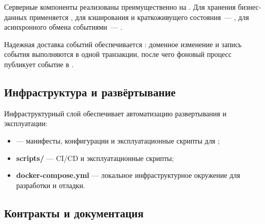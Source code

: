 \documentclass[12pt,a4paper]{extarticle}
\begin{document}
\begin{hseExample}
Серверные компоненты реализованы преимущественно на . Для хранения бизнес-данных применяется , для кэширования и краткоживущего состояния~--- , для асинхронного обмена событиями~--- .

Надежная доставка событий обеспечивается : доменное изменение и запись события выполняются в одной транзакции, после чего фоновый процесс публикует событие в .
\end{hseExample}

\subsection{Инфраструктура и развёртывание}

\begin{hseExample}
Инфраструктурный слой обеспечивает автоматизацию развертывания и эксплуатации:

\begin{itemize}[leftmargin=1.25cm]
    \item \textbf{} --- манифесты, конфигурации и эксплуатационные скрипты для ;
    \item \textbf{scripts/} --- CI/CD и эксплуатационные скрипты;
    \item \textbf{docker-compose.yml} --- локальное инфраструктурное окружение для разработки и отладки.
\end{itemize}
\end{hseExample}

\subsection{Контракты и документация}
\end{document}
